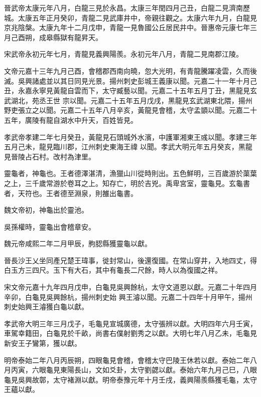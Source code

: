 \begin{pinyinscope}
 晉武帝太康元年八月，白龍三見於永昌。太康三年閏四月己丑，白龍二見濟南歷城。太康五年正月癸卯，青龍二見武庫井中，帝親往觀之。太康六年九月，白龍見京兆陰槃。太康九年十二月戊申，青龍一見魯國公丘居民井中。晉惠帝元康七年三月己酉朔，成皋縣獄有龍昇天。



 宋武帝永初元年七月，青龍見義興陽羨。永初元年八月，青龍二見南郡江陵。



 文帝元嘉十三年九月己酉，會稽郡西南向曉，忽大光明，有青龍騰躍凌雲，久而後滅。吳興諸處並以其日同見光景。揚州刺史彭城王義康以聞。元嘉二十一年十月己丑，永嘉永寧見黃龍自雲而下，太守臧藝以聞。元嘉二十五年五月丁丑，黑龍見玄武湖北，苑丞王世
 宗以聞。元嘉二十五年五月戊戌，黑龍見玄武湖東北隈，揚州野吏張立之以聞。元嘉二十五年八月辛亥，黃龍見會稽，太守孟顗以聞。元嘉二十五年，廣陵有龍自湖水中升天，百姓皆見。



 孝武帝孝建二年七月癸丑，黃龍見石頭城外水濱，中護軍湘東王彧以聞。孝建三年五月己未，龍見臨川郡，江州刺史東海王禕
 以聞。孝武大明元年五月癸亥，黑龍見晉陵占石村。改村為津里。



 靈龜者，神龜也。王者德澤湛清，漁獵山川從時則出。五色鮮明，三百歲游於蕖葉之上，三千歲常游於卷耳之上。知存亡，明於吉兇。禹卑宮室，靈龜見。玄龜書者，天符也。王者德至淵泉，則雒出龜書。



 魏文帝初，神龜出於靈池。



 吳孫權時，靈龜出會稽章安。



 魏元帝咸熙二年二月甲辰，朐䏰縣獲靈龜以獻。



 晉長沙王乂坐同產兄楚王瑋事，徙封常山，後還復國。在常山穿井，入地四丈，得白玉方三四尺。玉下有大石，其中有龜長二尺餘，時人以為復國之祥。



 宋文帝元嘉十九年四月戊申，白龜見吳興餘杭，太守文道恩以獻。元嘉二十年四月辛卯，白龜見吳興餘杭，揚州刺史始
 興王濬以聞。元嘉二十四年十月甲午，揚州刺史始興王濬獲白龜以獻。



 孝武帝大明三年三月戊子，毛龜見宣城廣德，太守張辨以獻。大明四年六月壬寅，車駕幸籍田，白龜見於千畝，尚書右僕射劉秀之以獻。大明七年八月乙未，毛龜見新安王子鸞第，獲以獻。



 明帝泰始二年八月丙辰朔，四眼龜見會稽，會稽太守巴陵王休若以獻。泰始二年八月丙寅，六眼龜見東陽長山，文如爻卦，太守劉勰以獻。泰始六年九月己巳，八眼龜見吳興故鄣，太守褚淵以獻。明帝泰豫元年十月壬戌，義興陽羨縣獲毛龜，太守王蘊以獻。



\end{pinyinscope}
